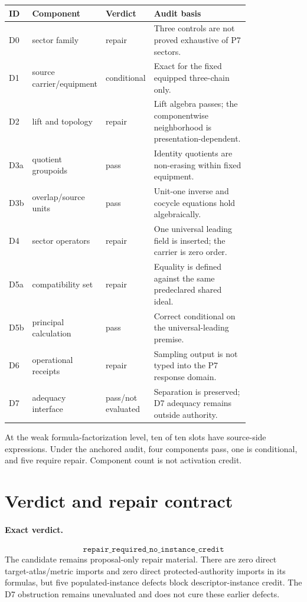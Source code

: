 \documentclass[11pt]{article}
\begin{document}
\begin{longtable}{>{\raggedright\arraybackslash}p{0.06\linewidth}
                  >{\raggedright\arraybackslash}p{0.21\linewidth}
                  >{\raggedright\arraybackslash}p{0.14\linewidth}
                  >{\raggedright\arraybackslash}p{0.40\linewidth}}
\toprule
ID & Component & Verdict & Audit basis \\ \midrule
\endhead
D0 & sector family & repair & Three controls are not proved exhaustive of P7 sectors. \\
D1 & source carrier/equipment & conditional & Exact for the fixed equipped three-chain only. \\
D2 & lift and topology & repair & Lift algebra passes; the componentwise neighborhood is presentation-dependent. \\
D3a & quotient groupoids & pass & Identity quotients are non-erasing within fixed equipment. \\
D3b & overlap/source units & pass & Unit-one inverse and cocycle equations hold algebraically. \\
D4 & sector operators & repair & One universal leading field is inserted; the carrier is zero order. \\
D5a & compatibility set & repair & Equality is defined against the same predeclared shared ideal. \\
D5b & principal calculation & pass & Correct conditional on the universal-leading premise. \\
D6 & operational receipts & repair & Sampling output is not typed into the P7 response domain. \\
D7 & adequacy interface & pass/not evaluated & Separation is preserved; D7 adequacy remains outside authority. \\
\bottomrule
\end{longtable}

At the weak formula-factorization level, ten of ten slots have source-side
expressions.  Under the anchored audit, four components pass, one is
conditional, and five require repair.  Component count is not activation
credit.

\section{Verdict and repair contract}

\paragraph{Exact verdict.}
\[
 \boxed{\texttt{repair\_required\_no\_instance\_credit}}
\]
The candidate remains proposal-only repair material.  There are zero direct
target-atlas/metric imports and zero direct protected-authority imports in its
formulas, but five populated-instance defects block descriptor-instance
credit.  The D7 obstruction remains unevaluated and does not cure these
earlier defects.
\end{document}
